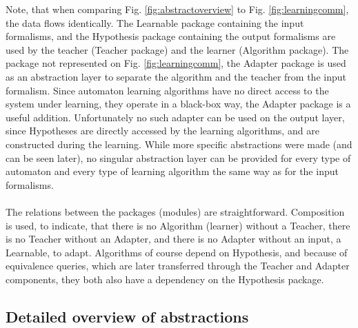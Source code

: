 Note, that when comparing Fig. \ref{fig:abstractoverview} to Fig. \ref{fig:learningcomm}, the data flows identically. The Learnable package containing the input formalisms, and the Hypothesis package containing the output formalisms are used by the teacher (Teacher package) and the learner (Algorithm package). The package not represented on Fig. \ref{fig:learningcomm}, the Adapter package is used as an abstraction layer to separate the algorithm and the teacher from the input formalism. Since automaton learning algorithms have no direct access to the system under learning, they operate in a black-box way, the Adapter package is a useful addition. Unfortunately no such adapter can be used on the output layer, since Hypotheses are directly accessed by the learning algorithms, and are constructed during the learning. While more specific abstractions were made (and can be seen later), no singular abstraction layer can be provided for every type of automaton and every type of learning algorithm the same way as for the input formalisms.
\\\\
The relations between the packages (modules) are straightforward. Composition is used, to indicate, that there is no Algorithm (learner) without a Teacher, there is no Teacher without an Adapter, and there is no Adapter without an input, a Learnable, to adapt. Algorithms of course depend on Hypothesis, and because of equivalence queries, which are later transferred through the Teacher and Adapter components, they both also have a dependency on the Hypothesis package.

\subsection{Detailed overview of abstractions}


